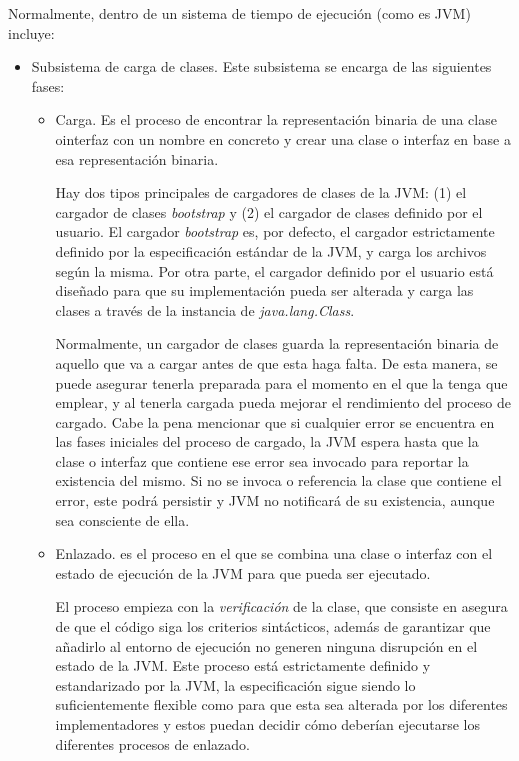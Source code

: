 \documentclass[english,runningheads,a4paper]{llncs}[2018/03/10]
\begin{document}
 Normalmente, dentro de un sistema de tiempo de ejecución (como es JVM) incluye:
\begin{itemize}
    \item Subsistema de carga de clases. Este subsistema se encarga de las siguientes fases: \begin{itemize}
        \item Carga. Es el proceso de encontrar la representación binaria de una clase ointerfaz con un nombre en concreto y crear una clase o interfaz en base a esa representación binaria.

Hay dos tipos principales de cargadores de clases de la JVM: (1) el
cargador de clases \textit{bootstrap} y (2) el cargador de clases definido por
el usuario. El cargador \textit{bootstrap} es, por defecto, el cargador
estrictamente definido por la especificación estándar de la JVM, y carga los
archivos según la misma. Por otra parte, el cargador definido por el usuario
está diseñado para que su implementación pueda ser alterada y carga las clases
a través de la instancia de \textit{java.lang.Class}.

Normalmente, un cargador de clases guarda la representación binaria de aquello
que va a cargar antes de que esta haga falta. De esta manera, se puede asegurar
tenerla preparada para el momento en el que la tenga que emplear, y al tenerla
cargada pueda mejorar el rendimiento del proceso de cargado. Cabe la pena
mencionar que si cualquier error se encuentra en las fases iniciales del proceso
de cargado, la JVM espera hasta que la clase o interfaz que contiene ese error
sea invocado para reportar la existencia del mismo. Si no se invoca o referencia
la clase que contiene el error, este podrá persistir y JVM no notificará de su
existencia, aunque sea consciente de ella.

        \item Enlazado. es el
proceso en el que se combina una clase o interfaz con el estado de ejecución de
la JVM para que pueda ser ejecutado.

El proceso empieza con la \textit{verificación} de la clase, que consiste en asegura de que el código siga los criterios sintácticos, además de garantizar que añadirlo al entorno de ejecución no generen ninguna
disrupción en el estado de la JVM. Este proceso está estrictamente
definido y estandarizado por la JVM, la especificación sigue siendo lo
suficientemente flexible como para que esta sea alterada por los diferentes
implementadores y estos puedan decidir cómo deberían ejecutarse los diferentes
procesos de enlazado.


\end{itemize}
\end{itemize}
\end{document}
